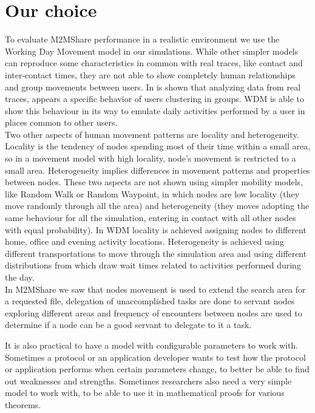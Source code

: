 \section{Our choice}
To evaluate M2MShare performance in a realistic environment we use the Working Day Movement model in our simulations. While other simpler models can reproduce some characteristics in common with real traces, like contact and inter-contact times, they are not able to show completely human relationships and group movements between users. In \cite{Natarajan:2007:UUI:1762888.1762904} is shown that analyzing data from real traces, appears a specific behavior of users clustering in groups. WDM is able to show this behaviour in its way to emulate daily activities performed by a user in places common to other users.
\\

Two other aspects of human movement patterns are locality and heterogeneity. Locality is the tendency of nodes spending most of their time within a small area, so in a movement model with high locality, node's movement is restricted to a small area. Heterogeneity implies differences in movement patterns and properties between nodes. These two aspects are not shown using simpler mobility models, like Random Walk or Random Waypoint, in which nodes are low locality (they move randomly through all the area) and heterogeneity (they moves adopting the same behaviour for all the simulation, entering in contact with all other nodes with equal probability). In WDM locality is achieved assigning nodes to different home, office and evening activity locations. Heterogeneity is achieved using different transportations to move through the simulation area and using different distributions from which draw wait times related to activities performed during the day.
\\


 
In M2MShare we saw that nodes movement is used to extend the search area for a requested file, delegation of unaccomplished tasks are done to servant nodes exploring different areas and frequency of encounters between nodes are used to determine if a node can be a good servant to delegate to it a task.


It is also practical to have a model with configurable parameters to work with. Sometimes a protocol or an application developer wants to test how the protocol or application performs when certain parameters change, to better be able to find out weaknesses and strengths. Sometimes researchers also need a very simple model to work with, to be able to use it in mathematical proofs for various theorems.




